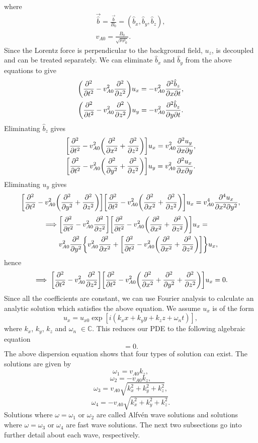 where
\begin{gather}
    \label{eq:b_hat}
    \vec{\hat{b}}=\frac{\vec{b}}{B_0}=(\hat{b}_x,\hat{b}_y,\hat{b}_z),\\
    v_{A0} = \frac{B_0}{\sqrt{\mu\rho_0}}.
\end{gather}
Since the Lorentz force is perpendicular to the background field, $u_z$, is decoupled and can be treated separately. We can eliminate $\hat{b}_x$ and $\hat{b}_y$ from the above equations to give
\begin{gather}
    \label{eq:ux_in_terms_of_bz}
   \qty(\pdv[2]{}{t}-v_{A0}^2\pdv[2]{}{z})u_x=-v_{A0}^2\pdv{\hat{b}_z}{x}{t}, \\
    \label{eq:uy_in_terms_of_bz}
   \qty(\pdv[2]{}{t}-v_{A0}^2\pdv[2]{}{z})u_y=-v_{A0}^2\pdv{\hat{b}_z}{y}{t}.
\end{gather}
Eliminating $\hat{b}_z$ gives
\begin{gather}
   \qty[\pdv[2]{}{t}-v_{A0}^2\qty(\pdv[2]{}{x}+\pdv[2]{}{z})]u_x=v_{A0}^2\pdv{u_y}{x}{y}, \\
    \label{eq:uy_in_terms_of_ux}
   \qty[\pdv[2]{}{t}-v_{A0}^2\qty(\pdv[2]{y}+\pdv[2]{}{z})]u_y=v_{A0}^2\pdv{u_x}{x}{y}.
\end{gather}
Eliminating $u_y$ gives
\[\qty[\pdv[2]{}{t}-v_{A0}^2\qty(\pdv[2]{y}+\pdv[2]{}{z})]\qty[\pdv[2]{}{t}-v_{A0}^2\qty(\pdv[2]{}{x}+\pdv[2]{}{z})]u_x=v_{A0}^4\frac{\partial^4 u_x}{\partial x^2 \partial y^2},\]
\[\begin{aligned}
\implies &\qty[\pdv[2]{}{t}-v_{A0}^2\pdv[2]{}{z}]\qty[\pdv[2]{}{t}-v_{A0}^2\qty(\pdv[2]{}{x}+\pdv[2]{}{z})]u_x=\\
&v_{A0}^2\pdv[2]{}{y}\qty{v_{A0}^2\pdv[2]{}{x}+\qty[\pdv[2]{}{t}-v_{A0}^2\qty(\pdv[2]{}{x}+\pdv[2]{}{z})]}u_x,
\end{aligned}\]
hence
\begin{equation}
    \implies \qty[\pdv[2]{}{t}-v_{A0}^2\pdv[2]{}{z}]\qty[\pdv[2]{}{t}-v_{A0}^2\qty(\pdv[2]{}{x}+\pdv[2]{}{y}+\pdv[2]{}{z})]u_x=0.
\end{equation}
Since all the coefficients are constant, we can use Fourier analysis to calculate an analytic solution which satisfies the above equation. We assume $u_x$ is of the form
\[u_x = u_{x0}\exp[i(k_x x + k_y y + k_z z + \omega_n t)],\]
where $k_x$, $k_y$, $k_z$ and $\omega_n$ $\in \mathds{C}$.
This reduces our PDE to the following algebraic equation
\begin{equation}
    [\omega_n^2 - v_{A0}^2k_z^2][\omega_n^2 - v_{A0}^2(k_x^2+k_y^2+k_z^2)] = 0.
\end{equation}
The above dispersion equation shows that four types of solution can exist. The solutions are given by
\[\omega_1 = v_{A0}k_z,\]
\[\omega_2 = -v_{A0}k_z,\]
\[\omega_3 = v_{A0}\sqrt{k_x^2 + k_y^2 + k_z^2},\]
\[\omega_4 = -v_{A0}\sqrt{k_x^2 + k_y^2 + k_z^2}.\]
Solutions where $\omega = \omega_1$ or $\omega_2$ are called Alfv\'en wave solutions and solutions where $\omega = \omega_3$ or $\omega_4$ are fast wave solutions. The next two subsections go into further detail about each wave, respectively.

